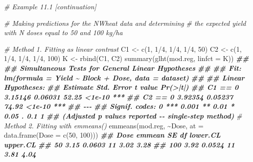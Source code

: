 \documentclass[
  12pt,
]{book}
\newenvironment{Shaded}{\begin{snugshade}}{\end{snugshade}}
\newcommand{\AttributeTok}[1]{\textcolor[rgb]{0.77,0.63,0.00}{#1}}
\newcommand{\CommentTok}[1]{\textcolor[rgb]{0.56,0.35,0.01}{\textit{#1}}}
\newcommand{\DecValTok}[1]{\textcolor[rgb]{0.00,0.00,0.81}{#1}}
\newcommand{\DocumentationTok}[1]{\textcolor[rgb]{0.56,0.35,0.01}{\textbf{\textit{#1}}}}
\newcommand{\FunctionTok}[1]{\textcolor[rgb]{0.00,0.00,0.00}{#1}}
\newcommand{\NormalTok}[1]{#1}
\newcommand{\OtherTok}[1]{\textcolor[rgb]{0.56,0.35,0.01}{#1}}
\newcommand{\SpecialCharTok}[1]{\textcolor[rgb]{0.00,0.00,0.00}{#1}}
\begin{document}
\begin{Shaded}
\begin{Highlighting}[]
\CommentTok{\# Example 11.1 [continuation]}


\CommentTok{\# Making predictions for the NWheat data and determining}
\CommentTok{\# the expected yield with N doses equal to 50 and 100 kg/ha }

\CommentTok{\# Method 1. Fitting as linear contrast}
\NormalTok{C1 }\OtherTok{\textless{}{-}} \FunctionTok{c}\NormalTok{(}\DecValTok{1}\NormalTok{, }\DecValTok{1}\SpecialCharTok{/}\DecValTok{4}\NormalTok{, }\DecValTok{1}\SpecialCharTok{/}\DecValTok{4}\NormalTok{, }\DecValTok{1}\SpecialCharTok{/}\DecValTok{4}\NormalTok{, }\DecValTok{50}\NormalTok{)}
\NormalTok{C2 }\OtherTok{\textless{}{-}} \FunctionTok{c}\NormalTok{(}\DecValTok{1}\NormalTok{, }\DecValTok{1}\SpecialCharTok{/}\DecValTok{4}\NormalTok{, }\DecValTok{1}\SpecialCharTok{/}\DecValTok{4}\NormalTok{, }\DecValTok{1}\SpecialCharTok{/}\DecValTok{4}\NormalTok{, }\DecValTok{100}\NormalTok{)}
\NormalTok{K }\OtherTok{\textless{}{-}} \FunctionTok{rbind}\NormalTok{(C1, C2)}
\FunctionTok{summary}\NormalTok{(}\FunctionTok{glht}\NormalTok{(mod.reg, }\AttributeTok{linfct =}\NormalTok{ K))}
\DocumentationTok{\#\# }
\DocumentationTok{\#\#   Simultaneous Tests for General Linear Hypotheses}
\DocumentationTok{\#\# }
\DocumentationTok{\#\# Fit: lm(formula = Yield \textasciitilde{} Block + Dose, data = dataset)}
\DocumentationTok{\#\# }
\DocumentationTok{\#\# Linear Hypotheses:}
\DocumentationTok{\#\#         Estimate Std. Error t value Pr(\textgreater{}|t|)    }
\DocumentationTok{\#\# C1 == 0  3.15146    0.06031   52.25   \textless{}1e{-}10 ***}
\DocumentationTok{\#\# C2 == 0  3.92354    0.05237   74.92   \textless{}1e{-}10 ***}
\DocumentationTok{\#\# {-}{-}{-}}
\DocumentationTok{\#\# Signif. codes:  0 \textquotesingle{}***\textquotesingle{} 0.001 \textquotesingle{}**\textquotesingle{} 0.01 \textquotesingle{}*\textquotesingle{} 0.05 \textquotesingle{}.\textquotesingle{} 0.1 \textquotesingle{} \textquotesingle{} 1}
\DocumentationTok{\#\# (Adjusted p values reported {-}{-} single{-}step method)}
\CommentTok{\# Method 2. Fitting with emmeans()}
\FunctionTok{emmeans}\NormalTok{(mod.reg, }\SpecialCharTok{\textasciitilde{}}\NormalTok{Dose, }\AttributeTok{at =} \FunctionTok{data.frame}\NormalTok{(}\AttributeTok{Dose =} \FunctionTok{c}\NormalTok{(}\DecValTok{50}\NormalTok{, }\DecValTok{100}\NormalTok{)))}
\DocumentationTok{\#\#  Dose emmean     SE df lower.CL upper.CL}
\DocumentationTok{\#\#    50   3.15 0.0603 11     3.02     3.28}
\DocumentationTok{\#\#   100   3.92 0.0524 11     3.81     4.04}

\end{Highlighting}
\end{Shaded}
\end{document}
